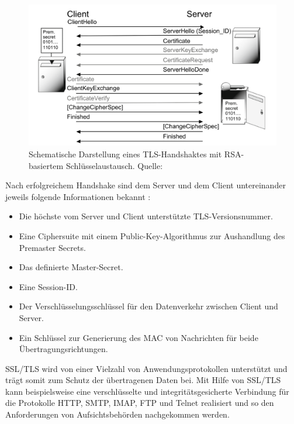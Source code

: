 \begin{figure}[H]
    \centering
  \includegraphics[scale=0.2]{images/uploads/a_figure_09.png}
  \caption{Schematische Darstellung eines TLS-Handshaktes mit RSA-basiertem Schlüsselaustausch. Quelle: \autocite{SchwenkJörg2020SuKi}}
  \label{fig:best-practice TLS-Handshake}
\end{figure}
\bigbreak
Nach erfolgreichem Handshake sind dem Server und dem Client untereinander jeweils folgende Informationen bekannt \autocite{SchwenkJörg2020SuKi}:
\begin{itemize}
    \item Die höchste vom Server und Client unterstützte TLS-Versionsnummer.
    \item Eine Ciphersuite mit einem Public-Key-Algorithmus zur Aushandlung des Premaster Secrets.
    \item Das definierte Master-Secret.
    \item Eine Session-ID.
    \item Der Verschlüsselungsschlüssel für den Datenverkehr zwischen Client und Server.
    \item Ein Schlüssel zur Generierung des MAC von Nachrichten für beide Übertragungsrichtungen.
\end{itemize}
\bigbreak
SSL/TLS wird von einer Vielzahl von Anwendungsprotokollen unterstützt und trägt somit zum Schutz der übertragenen Daten bei. Mit Hilfe von SSL/TLS kann beispielsweise eine verschlüsselte und integritätsgesicherte Verbindung für die Protokolle \glqq{}HTTP\grqq{}, \glqq{}SMTP\grqq{}, \glqq{}IMAP\grqq{}, \glqq{}FTP\grqq{} und \glqq{}Telnet\grqq{} realisiert und so den Anforderungen von Aufsichtsbehörden nachgekommen werden. \autocite{2022C}

